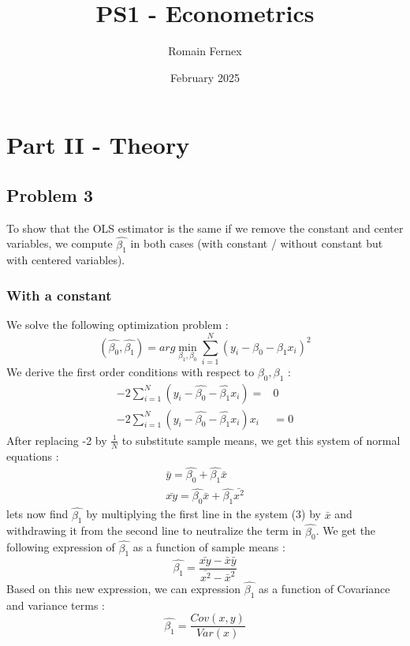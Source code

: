 \documentclass{article}
\title{PS1 - Econometrics}
\author{Romain Fernex}
\date{February 2025}
\begin{document}
\maketitle
\tableofcontents


\section{Part II - Theory}

\subsection{Problem 3}
To show that the OLS estimator is the same if we remove the constant and center variables, we compute $\hat{\beta_1}$ in both cases (with constant / without constant but with centered variables).
\subsubsection{With a constant}
We solve the following optimization problem : 
\begin{equation}
    (\hat{\beta_0},\hat{\beta_1}) = arg\min_{\beta_1,\beta_0}\sum_{i=1}^N (y_i-\beta_0-\beta_1x_i)^2
\end{equation}
We derive the first order conditions with respect to $\beta_0, \beta_1$ :
\begin{equation}
\begin{aligned}
-2 \sum_{i=1}^N (y_i-\hat{\beta_0}-\hat{\beta_1}x_i)  =& 0 \\
-2 \sum_{i=1}^N (y_i-\hat{\beta_0}-\hat{\beta_1}x_i)x_i & = 0
\end{aligned}
\end{equation}
After replacing -2 by $\frac{1}{N}$ to substitute sample means, we get this system of normal equations : 
\begin{equation}
\begin{aligned}
\bar{y} = \hat{\beta_0} + \hat{\beta_1}\bar{x} \\
\bar{xy} = \hat{\beta_0}\bar{x} + \hat{\beta_1}\bar{x^2} 
\end{aligned}
\end{equation}
lets now find $\hat{\beta_1}$ by multiplying the first line in the system (3) by $\bar{x}$ and withdrawing it from the second line to neutralize the term in $\hat{\beta_0}$. 
We get the following expression of $\hat{\beta_1}$ as a function of sample means : 
\begin{equation}
    \hat{\beta_1} = \frac{\bar{xy} - \bar{x}\bar{y}}{\bar{x^2}-\bar{x}^2} 
\end{equation}
Based on this new expression, we can expression $\hat{\beta_1}$ as a function of Covariance and variance terms : 
\begin{equation}
    \hat{\beta_1} = \frac{Cov(x,y)}{Var(x)}
\end{equation}
\end{document}
